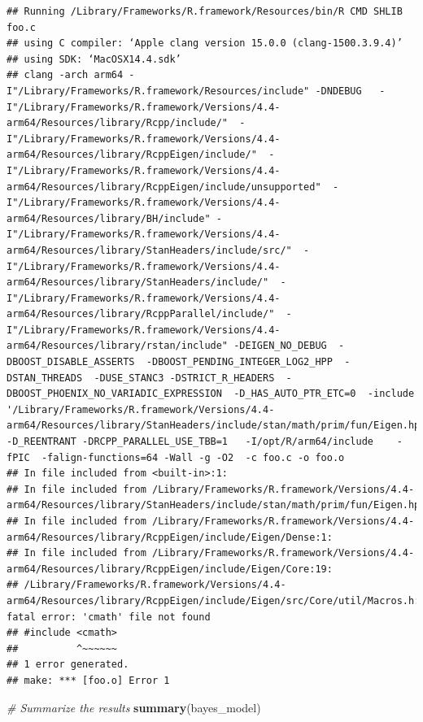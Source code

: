 \documentclass[
]{book}
\newenvironment{Shaded}{\begin{snugshade}}{\end{snugshade}}
\newcommand{\CommentTok}[1]{\textcolor[rgb]{0.56,0.35,0.01}{\textit{#1}}}
\newcommand{\FunctionTok}[1]{\textcolor[rgb]{0.13,0.29,0.53}{\textbf{#1}}}
\newcommand{\NormalTok}[1]{#1}
\begin{document}
\begin{verbatim}
## Running /Library/Frameworks/R.framework/Resources/bin/R CMD SHLIB foo.c
## using C compiler: ‘Apple clang version 15.0.0 (clang-1500.3.9.4)’
## using SDK: ‘MacOSX14.4.sdk’
## clang -arch arm64 -I"/Library/Frameworks/R.framework/Resources/include" -DNDEBUG   -I"/Library/Frameworks/R.framework/Versions/4.4-arm64/Resources/library/Rcpp/include/"  -I"/Library/Frameworks/R.framework/Versions/4.4-arm64/Resources/library/RcppEigen/include/"  -I"/Library/Frameworks/R.framework/Versions/4.4-arm64/Resources/library/RcppEigen/include/unsupported"  -I"/Library/Frameworks/R.framework/Versions/4.4-arm64/Resources/library/BH/include" -I"/Library/Frameworks/R.framework/Versions/4.4-arm64/Resources/library/StanHeaders/include/src/"  -I"/Library/Frameworks/R.framework/Versions/4.4-arm64/Resources/library/StanHeaders/include/"  -I"/Library/Frameworks/R.framework/Versions/4.4-arm64/Resources/library/RcppParallel/include/"  -I"/Library/Frameworks/R.framework/Versions/4.4-arm64/Resources/library/rstan/include" -DEIGEN_NO_DEBUG  -DBOOST_DISABLE_ASSERTS  -DBOOST_PENDING_INTEGER_LOG2_HPP  -DSTAN_THREADS  -DUSE_STANC3 -DSTRICT_R_HEADERS  -DBOOST_PHOENIX_NO_VARIADIC_EXPRESSION  -D_HAS_AUTO_PTR_ETC=0  -include '/Library/Frameworks/R.framework/Versions/4.4-arm64/Resources/library/StanHeaders/include/stan/math/prim/fun/Eigen.hpp'  -D_REENTRANT -DRCPP_PARALLEL_USE_TBB=1   -I/opt/R/arm64/include    -fPIC  -falign-functions=64 -Wall -g -O2  -c foo.c -o foo.o
## In file included from <built-in>:1:
## In file included from /Library/Frameworks/R.framework/Versions/4.4-arm64/Resources/library/StanHeaders/include/stan/math/prim/fun/Eigen.hpp:22:
## In file included from /Library/Frameworks/R.framework/Versions/4.4-arm64/Resources/library/RcppEigen/include/Eigen/Dense:1:
## In file included from /Library/Frameworks/R.framework/Versions/4.4-arm64/Resources/library/RcppEigen/include/Eigen/Core:19:
## /Library/Frameworks/R.framework/Versions/4.4-arm64/Resources/library/RcppEigen/include/Eigen/src/Core/util/Macros.h:679:10: fatal error: 'cmath' file not found
## #include <cmath>
##          ^~~~~~~
## 1 error generated.
## make: *** [foo.o] Error 1
\end{verbatim}

\begin{Shaded}
\begin{Highlighting}[]
\CommentTok{\# Summarize the results}
\FunctionTok{summary}\NormalTok{(bayes\_model)}
\end{Highlighting}
\end{Shaded}
\end{document}
